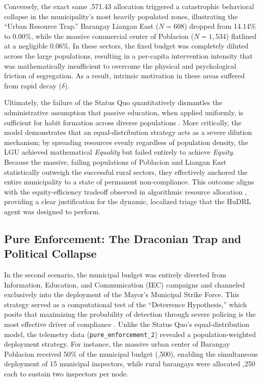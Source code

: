 Conversely, the exact same ,571.43 allocation triggered a catastrophic behavioral collapse in the municipality's most heavily populated zones, illustrating the ``Urban Resource Trap.'' Barangay Liangan East ($N=608$) dropped from 14.14\% to 0.00\%, while the massive commercial center of Poblacion ($N=1,534$) flatlined at a negligible 0.06\%. In these sectors, the fixed budget was completely diluted across the large populations, resulting in a per-capita intervention intensity that was mathematically insufficient to overcome the physical and psychological friction of segregation. As a result, intrinsic motivation in these areas suffered from rapid decay ($\delta$).

Ultimately, the failure of the Status Quo quantitatively dismantles the administrative assumption that passive education, when applied uniformly, is sufficient for habit formation across diverse populations \citep{Abdallah2021}. More critically, the model demonstrates that an equal-distribution strategy acts as a severe dilution mechanism; by spreading resources evenly regardless of population density, the LGU achieved mathematical \textit{Equality} but failed entirely to achieve \textit{Equity}. Because the massive, failing populations of Poblacion and Liangan East statistically outweigh the successful rural sectors, they effectively anchored the entire municipality to a state of permanent non-compliance. This outcome aligns with the equity-efficiency tradeoff observed in algorithmic resource allocation \citep{Alphonso2024}, providing a clear justification for the dynamic, localized triage that the HuDRL agent was designed to perform.


\subsection{Pure Enforcement: The Draconian Trap and Political Collapse}
In the second scenario, the municipal budget was entirely diverted from Information, Education, and Communication (IEC) campaigns and channeled exclusively into the deployment of the Mayor's Municipal Strike Force. This strategy served as a computational test of the ``Deterrence Hypothesis,'' which posits that maximizing the probability of detection through severe policing is the most effective driver of compliance \citep{Chen2023}. Unlike the Status Quo's equal-distribution model, the telemetry data (\texttt{pure\_enforcement\_2}) revealed a population-weighted deployment strategy. For instance, the massive urban center of Barangay Poblacion received 50\% of the municipal budget (,500), enabling the simultaneous deployment of 15 municipal inspectors, while rural barangays were allocated ,250 each to sustain two inspectors per node.

